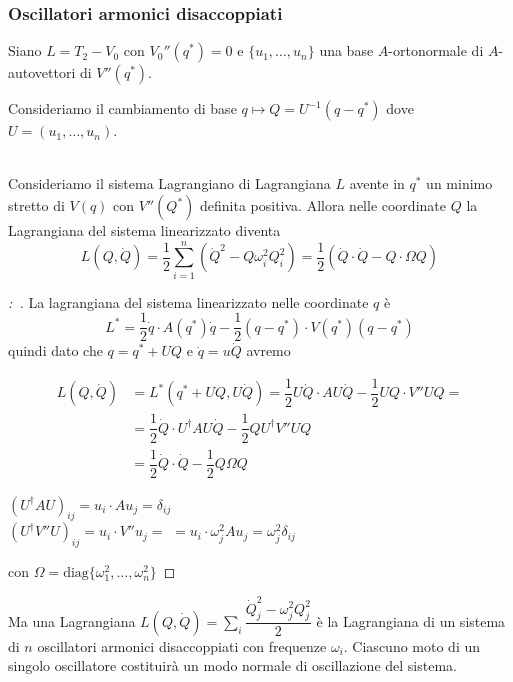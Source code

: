 \documentclass[11pt,a4paper,twoside]{book}
\newenvironment{proposizione}[1][\empty]{\begin{Proposizione}{
\ifx\empty#1\relax\else\mdseries\itshape#1\\\fi
}{}}{\end{Proposizione}}
\newenvironment{dimo}[1][\proofname]{
	\begin{tcolorbox}[
	breakable, 
	enhanced, 
	interior hidden, 
	frame hidden, 
	borderline west = {1pt}{0pt}{gray}, 
	top=0pt, bottom=0pt, left=0pt]
\begin{proof}[#1:~]
}
{
\end{proof}
\end{tcolorbox}
}
\theoremstyle{esss}
\theoremstyle{dotless}
\numberwithin{equation}{section} %
\begin{document}
\subsubsection{Oscillatori armonici disaccoppiati}

Siano $L=T_2-V_0$ con $V_0''(q^*)=0$ e $\{u_1, \dots, u_n\}$ una base $A$-ortonormale di $A$-autovettori di $V''(q^*)$.

Consideriamo il cambiamento di base $q\mapsto Q=U^{-1}(q-q^*)$ dove $U=\left(u_1,\dots ,u_n\right)$.


\begin{proposizione}
Consideriamo il sistema Lagrangiano di Lagrangiana $L$ avente in $q^*$ un minimo stretto di $V(q)$ con $V''(Q^*)$ definita positiva. Allora nelle coordinate $Q$ la Lagrangiana del sistema linearizzato diventa
\[
L(Q,\dot{Q})=\dfrac{1}{2}\sum_{i=1}^n \left(\dot{Q}^2-Q\omega_i^2Q_i^2\right)=\dfrac{1}{2}\left( \dot{Q}\cdot\dot{Q} - Q\cdot\Omega Q\right)
\]
\end{proposizione}
\begin{dimo}
La lagrangiana del sistema linearizzato nelle coordinate $q$ è
\[ L^*=\dfrac{1}{2}\dot{q}\cdot A(q^*)\dot{q} - \dfrac{1}{2}(q-q^*)\cdot V(q^*)(q-q^*)\]
quindi dato che $q=q^*+UQ$ e $\dot{q}=u\dot{Q}$ avremo


\begin{minipage}[H]{0.6\linewidth}
\begin{align*}
L(Q,\dot{Q})&=L^*(q^*+UQ,U\dot{Q})=\dfrac{1}{2} U\dot{Q}\cdot A U\dot{Q} - \dfrac{1}{2} UQ\cdot V'' UQ  =
\\
&= \dfrac{1}{2} \dot{Q}\cdot U^\dag AU \dot{Q} -\dfrac{1}{2} QU^\dag V'' UQ  
\\
&=\dfrac{1}{2} \dot{Q}\cdot\dot{Q} - \dfrac{1}{2} Q\Omega Q
\end{align*}
\end{minipage}
\begin{minipage}[H]{0.3\linewidth}\flushright
$\left(U^\dag AU\right)_{ij}=u_i \cdot A u_j = \delta_{ij}$  \\
$ \left(U^\dag V'' U \right)_{ij}=u_i\cdot V''u_j=$ $=u_i\cdot\omega_j^2 Au_j=\omega_j^2\delta_{ij} $
\end{minipage}

con $\Omega=\text{diag}\{\omega_1^2,\dots,\omega_n^2\}$ \qedhere
\end{dimo}

Ma una Lagrangiana $L(Q,\dot{Q})=\sum_i\dfrac{\dot{Q}_j^2-\omega_j^2 Q_j^2}{2}$ è la Lagrangiana di un sistema di $n$ oscillatori armonici disaccoppiati con frequenze $\omega_i$.
Ciascuno moto di un singolo oscillatore costituirà un modo normale di oscillazione del sistema.
\end{document}

